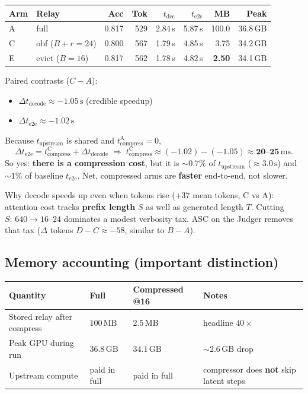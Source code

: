 \documentclass[11pt]{article}
\begin{document}
\begin{center}
\small
\begin{tabular}{@{}llrrrrrr@{}}
\toprule
Arm & Relay & Acc & Tok & $t_{\mathrm{dec}}$ & $t_{\mathrm{e2e}}$ & MB & Peak \\
\midrule
A & full & 0.817 & 529 & 2.84\,s & 5.87\,s & 100.0 & 36.8\,GB \\
C & obf ($B{+}r{=}24$) & 0.800 & 567 & 1.79\,s & 4.85\,s & 3.75 & 34.2\,GB \\
E & evict ($B{=}16$) & 0.817 & 562 & 1.78\,s & 4.82\,s & \textbf{2.50} & 34.1\,GB \\
\bottomrule
\end{tabular}
\end{center}

Paired contrasts ($C{-}A$):
\begin{itemize}[leftmargin=1.2em]
\item $\Delta t_{\mathrm{decode}} \approx -1.05\,\mathrm{s}$ (credible speedup)
\item $\Delta t_{\mathrm{e2e}} \approx -1.02\,\mathrm{s}$
\end{itemize}
Because $t_{\mathrm{upstream}}$ is shared and $t_{\mathrm{compress}}^{\mathrm{A}}=0$,
\[
\Delta t_{\mathrm{e2e}}
  = t_{\mathrm{compress}}^{\mathrm{C}}
  + \Delta t_{\mathrm{decode}}
  \;\Rightarrow\;
  t_{\mathrm{compress}}^{\mathrm{C}}
  \approx (-1.02)-(-1.05)
  \approx \mathbf{20\text{--}25\,\mathrm{ms}}.
\]
So yes: \textbf{there is a compression cost}, but it is $\sim\!0.7\%$ of
$t_{\mathrm{upstream}}$ ($\approx 3.0\,\mathrm{s}$) and $\sim\!1\%$ of baseline
$t_{\mathrm{e2e}}$. Net, compressed arms are \textbf{faster} end-to-end, not
slower.

Why decode speeds up even when tokens rise ($+37$ mean tokens, C vs A):
attention cost tracks \textbf{prefix length} $S$ as well as generated length
$T$. Cutting $S{:}\,640\to 16$--$24$ dominates a modest verbosity tax. ASC on
the Judger removes that tax ($\Delta$ tokens $D{-}C\approx -58$, similar to
$B{-}A$).

\subsection{Memory accounting (important distinction)}

\begin{center}
\begin{tabular}{@{}llll@{}}
\toprule
Quantity & Full & Compressed @16 & Notes \\
\midrule
Stored relay after compress
  & $100\,\mathrm{MB}$ & $2.5\,\mathrm{MB}$ & headline $40\times$ \\
Peak GPU during run
  & $36.8\,\mathrm{GB}$ & $34.1\,\mathrm{GB}$ & $\sim\!2.6\,\mathrm{GB}$ drop \\
Upstream compute
  & paid in full & paid in full
  & compressor does \textbf{not} skip latent steps \\
\bottomrule
\end{tabular}
\end{center}
\end{document}

